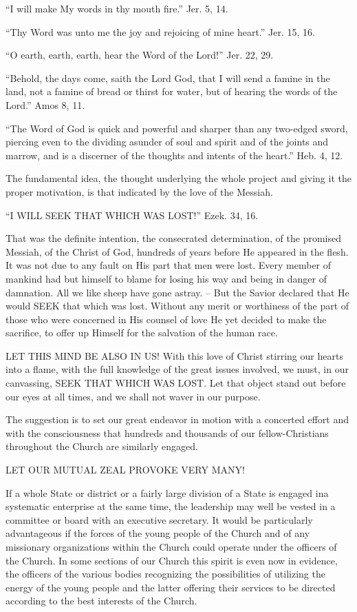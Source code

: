 \documentclass[
]{book}
\begin{document}
``I will make My words in thy mouth fire.'' Jer. 5, 14.

``Thy Word was unto me the joy and rejoicing of mine heart.'' Jer. 15, 16.

``O earth, earth, earth, hear the Word of the Lord!'' Jer. 22, 29.

``Behold, the days come, saith the Lord God, that I will send a famine in the land, not a famine of bread or thirst for water, but of hearing the words of the Lord.'' Amos 8, 11.

``The Word of God is quick and powerful and sharper than any two-edged sword, piercing even to the dividing asunder of soul and spirit and of the joints and marrow, and is a discerner of the thoughts and intents of the heart.'' Heb. 4, 12.

The fundamental idea, the thought underlying the whole project and giving it the proper motivation, is that indicated by the love of the Messiah.

``I WILL SEEK THAT WHICH WAS LOST!'' Ezek. 34, 16.

That was the definite intention, the consecrated determination, of the promised Messiah, of the Christ of God, hundreds of years before He appeared in the flesh. It was not due to any fault on His part that men were lost. Every member of mankind had but himself to blame for losing his way and being in danger of damnation. All we like sheep have gone astray. -- But the Savior declared that He would SEEK that which was lost. Without any merit or worthiness of the part of those who were concerned in His counsel of love He yet decided to make the sacrifice, to offer up Himself for the salvation of the human race.

LET THIS MIND BE ALSO IN US! With this love of Christ stirring our hearts into a flame, with the full knowledge of the great issues involved, we must, in our canvassing, SEEK THAT WHICH WAS LOST. Let that object stand out before our eyes at all times, and we shall not waver in our purpose.

The suggestion is to set our great endeavor in motion with a concerted effort and with the consciousness that hundreds and thousands of our fellow-Christians throughout the Church are similarly engaged.

LET OUR MUTUAL ZEAL PROVOKE VERY MANY!

If a whole State or district or a fairly large division of a State is engaged ina systematic enterprise at the same time, the leadership may well be vested in a committee or board with an executive secretary. It would be particularly advantageous if the forces of the young people of the Church and of any missionary organizations within the Church could operate under the officers of the Church. In some sections of our Church this spirit is even now in evidence, the officers of the various bodies recognizing the possibilities of utilizing the energy of the young people and the latter offering their services to be directed according to the best interests of the Church.
\end{document}
